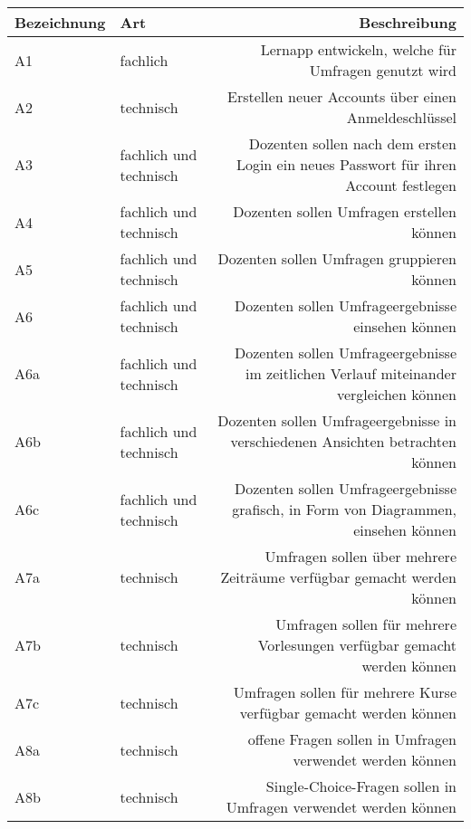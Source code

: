 \begin{table}[!htbp]
    \centering
    \begin{tabularx}{\textwidth}{l|k|r}
      \toprule
      {Bezeichnung} & {Art} & {Beschreibung} \\
      \midrule
      {\label{Anf:A1}A1} & fachlich & Lernapp entwickeln, welche für Umfragen genutzt wird \\
      \hline
      {\label{Anf:A2}A2} & technisch & Erstellen neuer Accounts über einen Anmeldeschlüssel \\
      \hline
      {\label{Anf:A3}A3} & fachlich und technisch & Dozenten sollen nach dem ersten Login ein neues Passwort für ihren Account festlegen \\
      \hline
      {\label{Anf:A4}A4} & fachlich und technisch & Dozenten sollen Umfragen erstellen können\\
      \hline
      {\label{Anf:A5}A5} & fachlich und technisch & Dozenten sollen Umfragen gruppieren können\\
      \hline
      {\label{Anf:A6}A6} & fachlich und technisch & Dozenten sollen Umfrageergebnisse einsehen können\\
      \hline
      {\label{Anf:A6a}A6a} & fachlich und technisch & Dozenten sollen Umfrageergebnisse im zeitlichen Verlauf miteinander vergleichen können\\
      \hline
      {\label{Anf:A6b}A6b} & fachlich und technisch & Dozenten sollen Umfrageergebnisse in verschiedenen Ansichten betrachten können\\
      \hline
      {\label{Anf:A6c}A6c} & fachlich und technisch & Dozenten sollen Umfrageergebnisse grafisch, in Form von Diagrammen, einsehen können\\
      \hline
      {\label{Anf:A7a}A7a} & technisch & Umfragen sollen über mehrere Zeiträume verfügbar gemacht werden können \\
      \hline
      {\label{Anf:A7b}A7b} & technisch & Umfragen sollen für mehrere Vorlesungen verfügbar gemacht werden können \\
      \hline
      {\label{Anf:A7c}A7c} & technisch & Umfragen sollen für mehrere Kurse verfügbar gemacht werden können \\
      \hline
      {\label{Anf:A8a}A8a} & technisch & offene Fragen sollen in Umfragen verwendet werden können \\
      \hline
      {\label{Anf:A8b}A8b} & technisch & Single-Choice-Fragen sollen in Umfragen verwendet werden können \\
      \hline

\end{tabularx}
\end{table}
